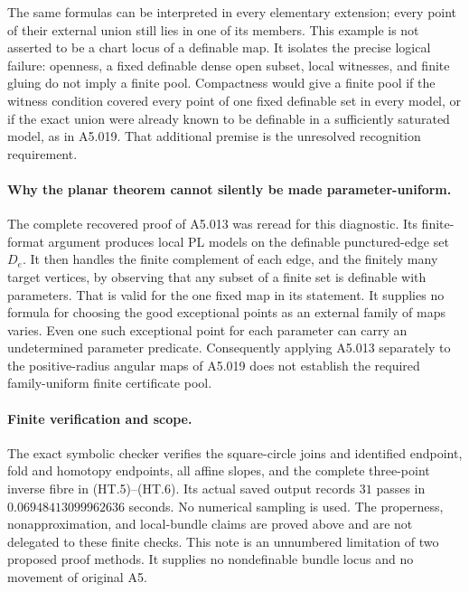 The same formulas can be interpreted in every elementary extension;
every point of their external union still lies in one of its members.
This example is not asserted to be a chart locus of a definable map.
It isolates the precise logical failure: openness, a fixed definable
dense open subset, local witnesses, and finite gluing do not imply a
finite pool. Compactness would give a finite pool if the witness
condition covered every point of one fixed definable set in every
model, or if the exact union were already known to be definable in a
sufficiently saturated model, as in A5.019. That additional premise
is the unresolved recognition requirement.

\paragraph{Why the planar theorem cannot silently be made parameter-uniform.}
The complete recovered proof of A5.013 was reread for this diagnostic.
Its finite-format argument produces local PL models on the definable
punctured-edge set $D_e$. It then handles the finite complement of
each edge, and the finitely many target vertices, by observing that
any subset of a finite set is definable with parameters. That is valid
for the one fixed map in its statement. It supplies no formula for
choosing the good exceptional points as an external family of maps
varies. Even one such exceptional point for each parameter can carry
an undetermined parameter predicate. Consequently applying A5.013
separately to the positive-radius angular maps of A5.019 does not
establish the required family-uniform finite certificate pool.

\paragraph{Finite verification and scope.}
The exact symbolic checker
verifies the square-circle joins and identified endpoint, fold and
homotopy endpoints, all affine slopes, and the complete three-point
inverse fibre in (HT.5)--(HT.6). Its actual saved output
records $31$ passes in $0.06948413099962636$ seconds. No numerical
sampling is used. The properness, nonapproximation, and local-bundle
claims are proved above and are not delegated to these finite checks.
This note is an unnumbered limitation of two proposed proof methods.
It supplies no nondefinable bundle locus and no movement of original A5.
